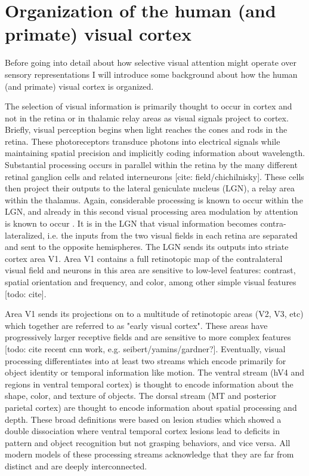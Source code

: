\section{Organization of the human (and primate) visual cortex}

Before going into detail about how selective visual attention might operate over sensory representations I will introduce some background about how the human (and primate) visual cortex is organized. 

The selection of visual information is primarily thought to occur in cortex and not in the retina or in thalamic relay areas as visual signals project to cortex. Briefly, visual perception begins when light reaches the cones and rods in the retina. These photoreceptors transduce photons into electrical signals while maintaining spatial precision and implicitly coding information about wavelength. Substantial processing occurs in parallel within the retina by the many different retinal ganglion cells and related interneurons [cite: field/chichilnisky]. These cells then project their outputs to the lateral geniculate nucleus (LGN), a relay area within the thalamus. Again, considerable processing is known to occur within the LGN, and already in this second visual processing area modulation by attention is known to occur \citep{OConnor2002-mx}. It is in the LGN that visual information becomes contra-lateralized, i.e. the inputs from the two visual fields in each retina are separated and sent to the opposite hemispheres. The LGN sends its outputs into striate cortex area V1. Area V1 contains a full retinotopic map of the contralateral visual field and neurons in this area are sensitive to low-level features: contrast, spatial orientation and frequency, and color, among other simple visual features [todo: cite].

Area V1 sends its projections on to a multitude of retinotopic areas (V2, V3, etc) which together are referred to as "early visual cortex". These areas have progressively larger receptive fields \citep{Dumoulin2008-uc} and are sensitive to more complex features [todo: cite recent cnn work, e.g. seibert/yamins/gardner?]. Eventually, visual processing differentiates into at least two streams \citep{Mishkin1983-ys} which encode primarily for object identity or temporal information like motion. The ventral stream (hV4 and regions in ventral temporal cortex) is thought to encode information about the shape, color, and texture of objects. The dorsal stream (MT and posterior parietal cortex) are thought to encode information about spatial processing and depth. These broad definitions were based on lesion studies which showed a double dissociation where ventral temporal cortex lesions lead to deficits in pattern and object recognition but not grasping behaviors, and vice versa. All modern models of these processing streams acknowledge that they are far from distinct and are deeply interconnected.

